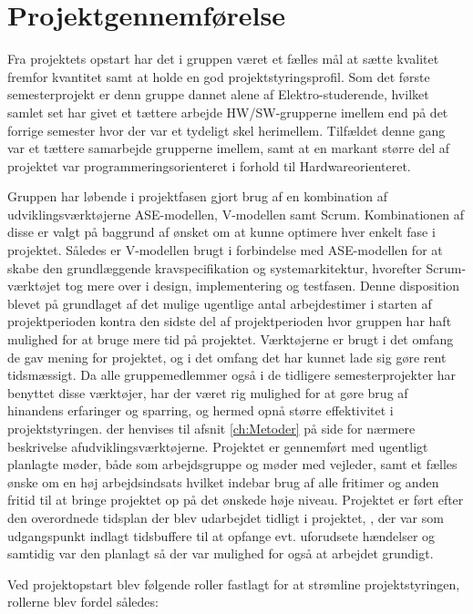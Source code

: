 \section{Projektgennemførelse} \label{ch:Projektgennemfoerelse}


Fra projektets opstart har det i gruppen været et fælles mål at sætte kvalitet fremfor kvantitet samt at holde en god projektstyringsprofil.  
Som  det første semesterprojekt er denn gruppe dannet alene af Elektro-studerende, hvilket samlet set har givet et tættere arbejde HW/SW-grupperne imellem end på det forrige semester hvor der var et tydeligt skel herimellem. 
Tilfældet denne gang var et tættere samarbejde grupperne imellem, samt at en markant større del af projektet var programmeringsorienteret i forhold til Hardwareorienteret. 

Gruppen har løbende i projektfasen gjort brug af en kombination af udviklingsværktøjerne ASE-modellen, V-modellen samt Scrum. 
Kombinationen af disse er valgt på baggrund af ønsket om at kunne optimere hver enkelt fase i projektet.
Således er V-modellen brugt i forbindelse med ASE-modellen for at skabe den grundlæggende kravspecifikation og systemarkitektur, hvorefter Scrum-værktøjet tog mere over i design, implementering og testfasen. 
Denne disposition blevet på grundlaget af det mulige ugentlige antal arbejdestimer i starten af projektperioden kontra den sidste del af projektperioden hvor gruppen har haft mulighed for at bruge mere tid på projektet.
Værktøjerne er brugt i det omfang de gav mening for projektet, og i det omfang det har kunnet lade sig gøre rent tidsmæssigt. 
Da alle gruppemedlemmer også i de tidligere semesterprojekter har benyttet disse værktøjer, har der været rig mulighed for at gøre brug af hinandens erfaringer og sparring,  og hermed opnå større effektivitet i projektstyringen. 
der henvises til afsnit \ref{ch:Metoder}  på side \pageref{ch:Metoder} for nærmere beskrivelse afudviklingsværktøjerne. 
Projektet er gennemført med ugentligt planlagte møder, både som arbejdsgruppe og møder med vejleder, samt et fælles ønske om en høj arbejdsindsats hvilket indebar brug af alle fritimer og anden fritid til at bringe projektet op på det ønskede høje niveau. 
Projektet er ført efter den overordnede tidsplan der blev udarbejdet tidligt i projektet, \cite{lib:Tidsplan}, der var som udgangspunkt indlagt tidsbuffere til at opfange evt. uforudsete hændelser og samtidig var den planlagt så der var mulighed for også at arbejdet grundigt.

Ved projektopstart blev følgende roller fastlagt for at strømline projektstyringen, rollerne blev fordel således: 

